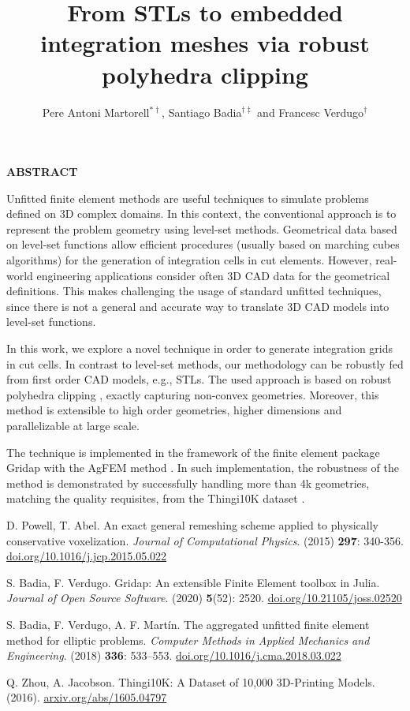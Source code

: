 \documentclass{coupled2019_abstract}
\title{From STLs to embedded integration meshes via robust polyhedra clipping}
\author{Pere Antoni Martorell$^{*\dag}$, Santiago Badia$^{\dag\ddag}$ and Francesc Verdugo$^{\dag}$ }
\begin{document}
\begin{center}
\bf ABSTRACT
\end{center}

Unfitted finite element methods are useful techniques to simulate problems defined on 3D complex domains. 
In this context, the conventional approach is to represent the problem geometry using level-set methods. 
Geometrical data based on level-set functions allow efficient procedures (usually based on marching cubes algorithms) for the generation of integration cells in cut elements. 
However, real-world engineering applications consider often 3D CAD data for the geometrical definitions. 
This makes challenging the usage of standard unfitted techniques, since there is not a general and accurate way to translate 3D CAD models into level-set functions.

In this work, we explore a novel technique in order to generate integration grids in cut cells.
In contrast to level-set methods, our methodology can be robustly fed from first order CAD models, e.g., STLs.
The used approach is based on robust polyhedra clipping \cite{Powel}, exactly capturing non-convex geometries.
Moreover, this method is extensible to high order geometries, higher dimensions and parallelizable at large scale.

The technique is implemented in the framework of the finite element package Gridap \cite{Gridap} with the AgFEM method \cite{AgFEM}. In such implementation, the robustness of the method is demonstrated by successfully handling more than 4k geometries, matching the quality requisites, from the Thingi10K dataset \cite{10k}.


\begin{thebibliography}{99}

D. Powell, T. Abel. 
An exact general remeshing scheme applied to physically conservative voxelization.
\textit{Journal of Computational Physics}.
(2015) \textbf{297}: 340-356. 
\url{doi.org/10.1016/j.jcp.2015.05.022}

S. Badia, F. Verdugo.
Gridap: An extensible Finite Element toolbox in Julia.
\textit{Journal of Open Source Software}. 
(2020) \textbf{5}(52): 2520.
\url{doi.org/10.21105/joss.02520}

S. Badia, F. Verdugo, A. F. Mart\'in.
The aggregated unfitted finite element method for elliptic problems.
\textit{Computer Methods in Applied Mechanics and Engineering}. 
(2018) \textbf{336}: 533--553. 
\url{doi.org/10.1016/j.cma.2018.03.022}

Q. Zhou, A. Jacobson. 
Thingi10K: A Dataset of 10,000 3D-Printing Models.
(2016).
\url{arxiv.org/abs/1605.04797}

\end{thebibliography}
\end{document}
